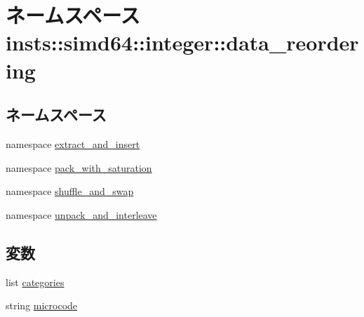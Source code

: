 \hypertarget{namespaceinsts_1_1simd64_1_1integer_1_1data__reordering}{
\section{ネームスペース insts::simd64::integer::data\_\-reordering}
\label{namespaceinsts_1_1simd64_1_1integer_1_1data__reordering}
}
\subsection*{ネームスペース}
\begin{DoxyCompactItemize}
\item 
namespace \hyperlink{namespaceinsts_1_1simd64_1_1integer_1_1data__reordering_1_1extract__and__insert}{extract\_\-and\_\-insert}
\item 
namespace \hyperlink{namespaceinsts_1_1simd64_1_1integer_1_1data__reordering_1_1pack__with__saturation}{pack\_\-with\_\-saturation}
\item 
namespace \hyperlink{namespaceinsts_1_1simd64_1_1integer_1_1data__reordering_1_1shuffle__and__swap}{shuffle\_\-and\_\-swap}
\item 
namespace \hyperlink{namespaceinsts_1_1simd64_1_1integer_1_1data__reordering_1_1unpack__and__interleave}{unpack\_\-and\_\-interleave}
\end{DoxyCompactItemize}
\subsection*{変数}
\begin{DoxyCompactItemize}
\item 
list \hyperlink{namespaceinsts_1_1simd64_1_1integer_1_1data__reordering_a273cf0f1630af14c1582f05e53354a55}{categories}
\item 
string \hyperlink{namespaceinsts_1_1simd64_1_1integer_1_1data__reordering_a770f11a173e99389a8802f0107ed8f52}{microcode}
\end{DoxyCompactItemize}


